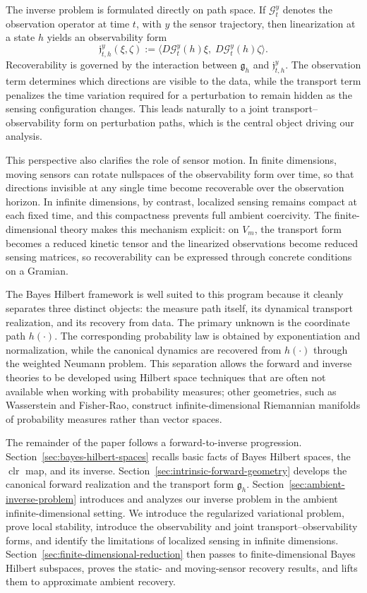 \documentclass{article}
\theoremstyle{definition}
\DeclareMathOperator{\clr}{clr}
\begin{document}
The inverse problem is formulated directly on path space. If \(\mathcal G_t^y\) denotes the observation operator at time \(t\), with \(y\) the sensor trajectory, then linearization at a state \(h\) yields an observability form
\[
    \mathfrak j_{t,h}^y(\xi,\zeta)
    :=
    \bigl\langle D\mathcal G_t^y(h)\xi,\;D\mathcal G_t^y(h)\zeta\bigr\rangle .
\]
Recoverability is governed by the interaction between \(\mathfrak g_h\) and \(\mathfrak j_{t,h}^y\). The observation term determines which directions are visible to the data, while the transport term penalizes the time variation required for a perturbation to remain hidden as the sensing configuration changes. This leads naturally to a joint transport--observability form on perturbation paths, which is the central object driving our analysis.

This perspective also clarifies the role of sensor motion. In finite dimensions, moving sensors can rotate nullspaces of the observability form over time, so that directions invisible at any single time become recoverable over the observation horizon.
In infinite dimensions, by contrast, localized sensing remains compact at each fixed time, and this compactness prevents full ambient coercivity.
The finite-dimensional theory makes this mechanism explicit: on \(V_m\), the transport form becomes a reduced kinetic tensor and the linearized observations become reduced sensing matrices, so recoverability can be expressed through concrete conditions on a Gramian.

The Bayes Hilbert framework is well suited to this program because it cleanly separates three distinct objects: the measure path itself, its dynamical transport realization, and its recovery from data. The primary unknown is the coordinate path \(h(\cdot)\). The corresponding probability law is obtained by exponentiation and normalization, while the canonical dynamics are recovered from \(h(\cdot)\) through the weighted Neumann problem. This separation allows the forward and inverse theories to be developed using Hilbert space techniques that are often not available when working with probability measures; other geometries, such as Wasserstein and Fisher-Rao, construct infinite-dimensional Riemannian manifolds of probability measures rather than vector spaces.

The remainder of the paper follows a forward-to-inverse progression. Section~\ref{sec:bayes-hilbert-spaces} recalls basic facts of Bayes Hilbert spaces, the $\clr$ map, and its inverse. Section~\ref{sec:intrinsic-forward-geometry} develops the canonical forward realization and the transport form \(\mathfrak g_h\). Section~\ref{sec:ambient-inverse-problem} introduces and analyzes our inverse problem in the ambient infinite-dimensional setting. We introduce the regularized variational problem, prove local stability, introduce the observability and joint transport--observability forms, and identify the limitations of localized sensing in infinite dimensions. Section~\ref{sec:finite-dimensional-reduction} then passes to finite-dimensional Bayes Hilbert subspaces, proves the static- and moving-sensor recovery results, and lifts them to approximate ambient recovery.
\end{document}

